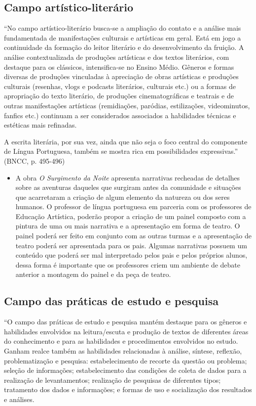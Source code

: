 \documentclass[12pt]{extarticle}
\begin{document}
\subsection{Campo artístico-literário }

``No campo artístico-literário busca-se a ampliação do contato e a
análise mais fundamentada de manifestações culturais e artísticas em
geral. Está em jogo a continuidade da formação do leitor literário e do
desenvolvimento da fruição. A análise contextualizada de produções
artísticas e dos textos literários, com destaque para os clássicos,
intensifica-se no Ensino Médio. Gêneros e formas diversas de produções
vinculadas à apreciação de obras artísticas e produções culturais
(resenhas, vlogs e podcasts literários, culturais etc.) ou a formas de
apropriação do texto literário, de produções cinematográficas e teatrais
e de outras manifestações artísticas (remidiações, paródias,
estilizações, videominutos, fanfics etc.) continuam a ser considerados
associados a habilidades técnicas e estéticas mais refinadas.

A escrita literária, por sua vez, ainda que não seja o foco central do
componente de Língua Portuguesa, também se mostra rica em possibilidades
expressivas.'' (BNCC, p. 495-496)

\begin{itemize}
\item
  A obra \emph{O Surgimento da Noite} apresenta narrativas recheadas de
  detalhes sobre as aventuras daqueles que surgiram antes da comunidade
  e situações que acarretaram a criação de algum elemento da natureza ou
  dos seres humanos. O professor de língua portuguesa em parceria com os
  professores de Educação Artística, poderão propor a criação de um
  painel composto com a pintura de uma ou mais narrativa e a
  apresentação em forma de teatro. O painel poderá ser feito em conjunto
  com as outras turmas e a apresentação de teatro poderá ser apresentada
  para os pais. Algumas narrativas possuem um conteúdo que poderá ser
  mal interpretado pelos pais e pelos próprios alunos, dessa forma é
  importante que os professores criem um ambiente de debate anterior a
  montagem do painel e da peça de teatro.
\end{itemize}

\subsection{Campo das práticas de estudo e pesquisa }

``O campo das práticas de estudo e pesquisa mantém destaque para os
gêneros e habilidades envolvidos na leitura/escuta e produção de textos
de diferentes áreas do conhecimento e para as habilidades e
procedimentos envolvidos no estudo. Ganham realce também as habilidades
relacionadas à análise, síntese, reflexão, problematização e pesquisa:
estabelecimento de recorte da questão ou problema; seleção de
informações; estabelecimento das condições de coleta de dados para a
realização de levantamentos; realização de pesquisas de diferentes
tipos; tratamento dos dados e informações; e formas de uso e
socialização dos resultados e análises.
\end{document}
